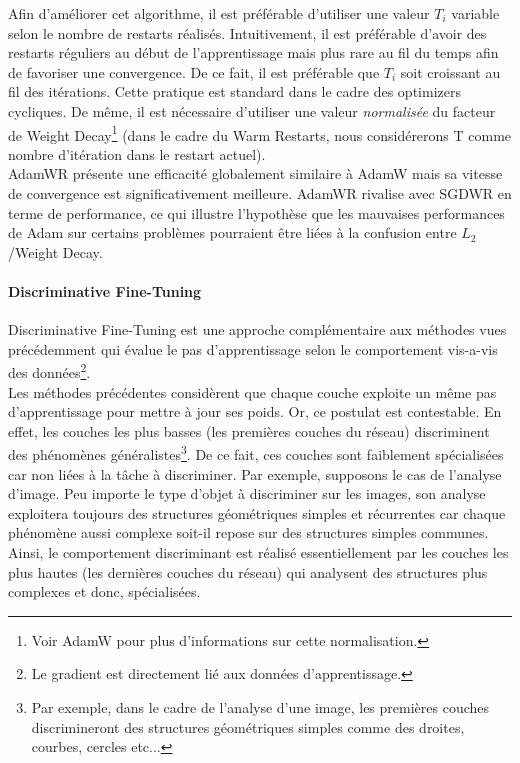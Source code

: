 \noindent Afin d'améliorer cet algorithme, il est préférable d'utiliser une valeur $T_i$ variable selon le nombre de restarts réalisés. Intuitivement, il est préférable d'avoir des restarts réguliers au début de l'apprentissage mais plus rare au fil du temps afin de favoriser une convergence. De ce fait, il est préférable que $T_i$ soit croissant au fil des itérations. Cette pratique est standard dans le cadre des optimizers cycliques. De même, il est nécessaire d'utiliser une valeur \textit{normalisée} du facteur de Weight Decay\footnote{Voir AdamW pour plus d'informations sur cette normalisation.} (dans le cadre du Warm Restarts, nous considérerons T comme nombre d'itération dans le restart actuel). \\

\noindent AdamWR présente une efficacité globalement similaire à AdamW mais sa vitesse de convergence est significativement meilleure. AdamWR rivalise avec SGDWR en terme de performance, ce qui illustre l'hypothèse que les mauvaises performances de Adam sur certains problèmes pourraient être liées à la confusion entre $L_2$/Weight Decay.

\paragraph{Discriminative Fine-Tuning}

\noindent Discriminative Fine-Tuning\cite{dis_fine_tun} est une approche complémentaire aux méthodes vues précédemment qui évalue le pas d'apprentissage selon le comportement vis-a-vis des données\footnote{Le gradient est directement lié aux données d'apprentissage.}.\\

\noindent Les méthodes précédentes considèrent que chaque couche exploite un même pas d'apprentissage pour mettre à jour ses poids. Or, ce postulat est contestable. En effet, les couches les plus basses (les premières couches du réseau) discriminent des phénomènes généralistes\footnote{Par exemple, dans le cadre de l'analyse d'une image, les premières couches discrimineront des structures géométriques simples comme des droites, courbes, cercles etc...}. De ce fait, ces couches sont faiblement spécialisées car non liées à la tâche à discriminer. Par exemple, supposons le cas de l'analyse d'image. Peu importe le type d'objet à discriminer sur les images, son analyse exploitera toujours des structures géométriques simples et récurrentes car chaque phénomène aussi complexe soit-il repose sur des structures simples communes. Ainsi, le comportement discriminant est réalisé essentiellement par les couches les plus hautes (les dernières couches du réseau) qui analysent des structures plus complexes et donc, spécialisées.\\

